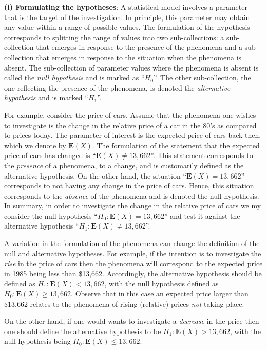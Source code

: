 \documentclass[]{krantz}
\newcommand{\Expec}{\mathbf{E}}
\theoremstyle{definition}
\theoremstyle{definition}
\theoremstyle{definition}
\theoremstyle{remark}
\begin{document}
{\textbf{(i) Formulating the hypotheses}}: A statistical model involves a
parameter that is the target of the investigation. In principle, this
parameter may obtain any value within a range of possible values. The
formulation of the hypothesis corresponds to splitting the range of
values into two sub-collections: a sub-collection that emerges in
response to the presence of the phenomena and a sub-collection that
emerges in response to the situation when the phenomena is absent. The
sub-collection of parameter values where the phenomena is absent is
called the \emph{null hypothesis} and is marked as ``\(H_0\)''. The other
sub-collection, the one reflecting the presence of the phenomena, is
denoted the \emph{alternative hypothesis} and is marked ``\(H_1\)''.

For example, consider the price of cars. Assume that the phenomena one
wishes to investigate is the change in the relative price of a car in
the 80's as compared to prices today. The parameter of interest is the
expected price of cars back then, which we denote by \(\Expec(X)\). The
formulation of the statement that the expected price of cars has changed
is ``\(\Expec(X) \not = 13,662\)''. This statement corresponds to the
\emph{presence} of a phenomena, to a change, and is customarily defined as
the alternative hypothesis. On the other hand, the situation
``\(\Expec(X) = 13,662\)'' corresponds to not having any change in the price
of cars. Hence, this situation corresponds to the \emph{absence} of the
phenomena and is denoted the null hypothesis. In summary, in order to
investigate the change in the relative price of cars we my consider the
null hypothesis ``\(H_0:\Expec(X) = 13,662\)'' and test it against the
alternative hypothesis ``\(H_1: \Expec(X)\not = 13,662\)''.

A variation in the formulation of the phenomena can change the
definition of the null and alternative hypotheses. For example, if the
intention is to investigate the \emph{rise} in the price of cars then the
phenomena will correspond to the expected price in 1985 being less than
\$13,662. Accordingly, the alternative hypothesis should be defined as
\(H_1: \Expec(X) < 13,662\), with the null hypothesis defined as
\(H_0: \Expec(X) \geq 13,662\). Observe that in this case an expected
price larger than \$13,662 relates to the phenomena of rising (relative)
prices \emph{not} taking place.

On the other hand, if one would wants to investigate a \emph{decrease} in the
price then one should define the alternative hypothesis to be
\(H_1: \Expec(X) > 13,662\), with the null hypothesis being
\(H_0: \Expec(X) \leq 13,662\).
\end{document}
